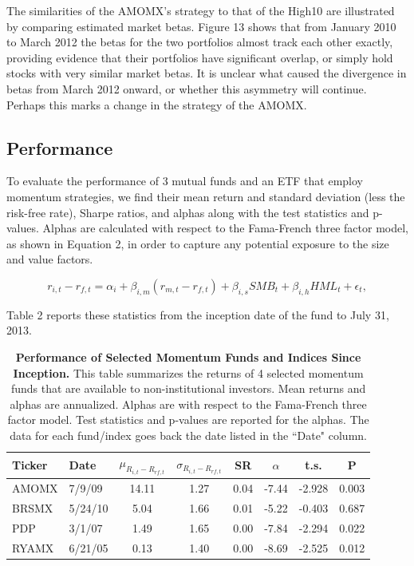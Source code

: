 \documentclass[12pt]{article}
\begin{document}
The similarities of the AMOMX's strategy to that of the High10 are illustrated by comparing estimated market betas. Figure 13 shows that from January 2010 to March 2012 the betas for the two portfolios almost track each other exactly, providing evidence that their portfolios have significant overlap, or simply hold stocks with very similar market betas. It is unclear what caused the divergence in betas from March 2012 onward, or whether this asymmetry will continue. Perhaps this marks a change in the strategy of the AMOMX.

\subsection{Performance}

To evaluate the performance of 3 mutual funds and an ETF that employ momentum strategies, we find their mean return and standard deviation (less the risk-free rate), Sharpe ratios, and alphas along with the test statistics and p-values. Alphas are calculated with respect to the Fama-French three factor model, as shown in Equation 2, in order to capture any potential exposure to the size and value factors.

\begin{equation}
r_{i,t}-r_{f,t}=\alpha_{i}+\beta_{i,m}(r_{m,t}-r_{f,t})+\beta_{i,s}SMB_{t}+\beta_{i,h}HML_{t}+\epsilon_{t},
\end{equation}

Table 2 reports these statistics from the inception date of the fund to July 31, 2013. 

\begin{table}[h]
\centering
\caption{\textbf{Performance of Selected Momentum Funds and Indices Since Inception.} {\footnotesize This table summarizes the returns of 4 selected momentum funds that are available to non-institutional investors. Mean returns and alphas are annualized. Alphas are with respect to the Fama-French three factor model. Test statistics and p-values are reported for the alphas. The data for each fund/index goes back the date listed in the ``Date" column.}}
\begin{tabular}{l | l | c | c | c | c | c | c}
\hline
Ticker & Date & $\mu_{R_{i,t}-R_{rf,t}} $ & $ \sigma_{R_{i,t}-R_{rf,t}} $ & SR & $\alpha$ & t.s. & P\\
\hline
AMOMX & 7/9/09 & 14.11 & 1.27 & 0.04 & -7.44 & -2.928 & 0.003 \\
BRSMX & 5/24/10 & 5.04 & 1.66 & 0.01 & -5.22 & -0.403 & 0.687 \\
PDP & 3/1/07 & 1.49 & 1.65 & 0.00 & -7.84 & -2.294 & 0.022 \\
RYAMX & 6/21/05 & 0.13 & 1.40 & 0.00 & -8.69 & -2.525 & 0.012 \\
\end{tabular}
\end{table}
\end{document}
